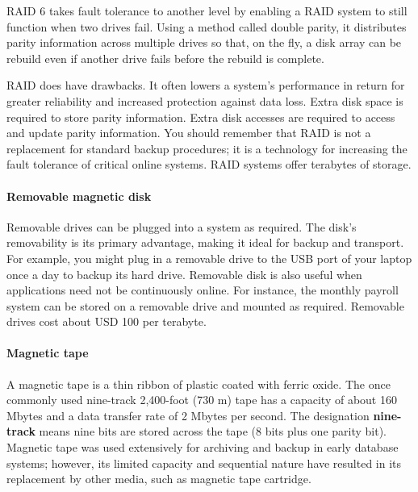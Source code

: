 \documentclass[
]{article}
\begin{document}
RAID 6 takes fault tolerance to another level by enabling a RAID system
to still function when two drives fail. Using a method called double
parity, it distributes parity information across multiple drives so
that, on the fly, a disk array can be rebuild even if another drive
fails before the rebuild is complete.

RAID does have drawbacks. It often lowers a system's performance in
return for greater reliability and increased protection against data
loss. Extra disk space is required to store parity information. Extra
disk accesses are required to access and update parity information. You
should remember that RAID is not a replacement for standard backup
procedures; it is a technology for increasing the fault tolerance of
critical online systems. RAID systems offer terabytes of storage.

\hypertarget{removable-magnetic-disk}{%
\paragraph*{Removable magnetic disk}\label{removable-magnetic-disk}}

Removable drives can be plugged into a system as required. The disk's
removability is its primary advantage, making it ideal for backup and
transport. For example, you might plug in a removable drive to the USB
port of your laptop once a day to backup its hard drive. Removable disk
is also useful when applications need not be continuously online. For
instance, the monthly payroll system can be stored on a removable drive
and mounted as required. Removable drives cost about USD 100 per
terabyte.

\hypertarget{magnetic-tape}{%
\paragraph*{Magnetic tape}\label{magnetic-tape}}

A magnetic tape is a thin ribbon of plastic coated with ferric oxide.
The once commonly used nine-track 2,400-foot (730 m) tape has a capacity
of about 160 Mbytes and a data transfer rate of 2 Mbytes per second. The
designation \textbf{nine-track} means nine bits are stored across the tape (8
bits plus one parity bit). Magnetic tape was used extensively for
archiving and backup in early database systems; however, its limited
capacity and sequential nature have resulted in its replacement by other
media, such as magnetic tape cartridge.
\end{document}
